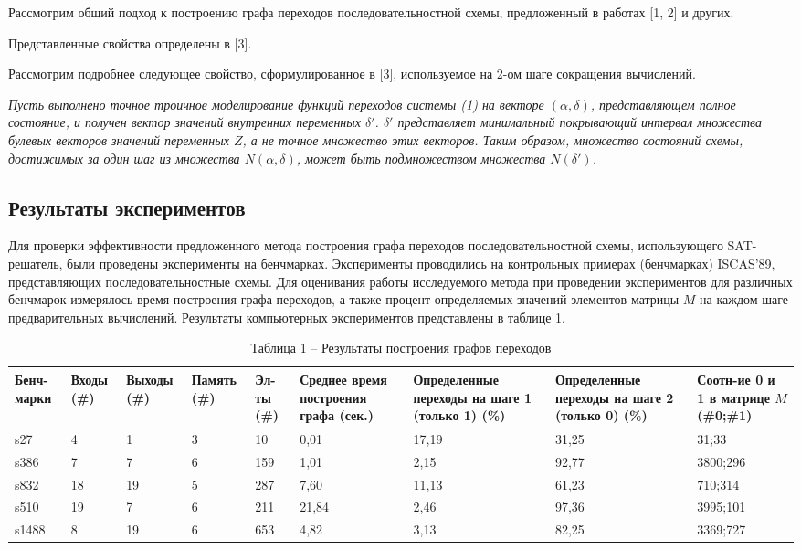 \documentclass[a4paper,12pt]{article}
\begin{document}
Рассмотрим общий подход к построению графа переходов последовательностной схемы, предложенный в работах [1, 2] и других.


Представленные свойства определены в [3].


Рассмотрим подробнее следующее свойство, сформулированное в [3], используемое на 2-ом шаге сокращения вычислений.


\textit{Пусть выполнено точное троичное моделирование функций переходов системы (1) на векторе $(\alpha,\delta)$, представляющем полное состояние, и получен вектор значений внутренних переменных $\delta'$. $\delta'$ представляет минимальный покрывающий интервал множества булевых векторов значений переменных $Z$, а не точное множество этих векторов. Таким образом, множество состояний схемы, достижимых за один шаг из множества $N(\alpha,\delta)$, может быть подмножеством множества $N(\delta')$.}

\subsection*{Результаты экспериментов}

Для проверки эффективности предложенного метода построения графа переходов последовательностной схемы, использующего SAT-решатель, были проведены эксперименты на бенчмарках. Эксперименты проводились на контрольных примерах (бенчмарках) ISCAS'89, представляющих последовательностные схемы. Для оценивания работы исследуемого метода при проведении экспериментов для различных бенчмарок измерялось время построения графа переходов, а также процент определяемых значений элементов матрицы $M$ на каждом шаге предварительных вычислений. Результаты компьютерных экспериментов представлены в таблице 1.

\vspace{0.5cm}

\begin{table}[H]
\centering
\caption*{Таблица 1 -- Результаты построения графов переходов}
\vspace{0.2cm}
\footnotesize
\begin{tabular}{|p{1.2cm}|p{0.9cm}|p{0.9cm}|p{0.9cm}|p{0.8cm}|p{2.2cm}|p{2.2cm}|p{2.2cm}|p{1.7cm}|}
\hline
Бенч-марки & 
Входы (\#) & 
Выходы (\#) & 
Память (\#) & 
Эл-ты (\#) & 
Среднее время построения графа (сек.) & 
Определенные переходы на шаге 1 (только 1) (\%) & 
Определенные переходы на шаге 2 (только 0) (\%) & 
Соотн-ие 0 и 1 в матрице $M$ (\#0;\#1) \\
\hline
s27   & 4  & 1  & 3  & 10  & 0,01  & 17,19 & 31,25 & 31;33 \\
\hline
s386  & 7  & 7  & 6  & 159 & 1,01  & 2,15  & 92,77 & 3800;296 \\
\hline
s832  & 18 & 19 & 5  & 287 & 7,60  & 11,13 & 61,23 & 710;314 \\
\hline
s510  & 19 & 7  & 6  & 211 & 21,84 & 2,46  & 97,36 & 3995;101 \\
\hline
s1488 & 8  & 19 & 6  & 653 & 4,82  & 3,13  & 82,25 & 3369;727 \\
\hline
\end{tabular}
\end{table}
\end{document}
